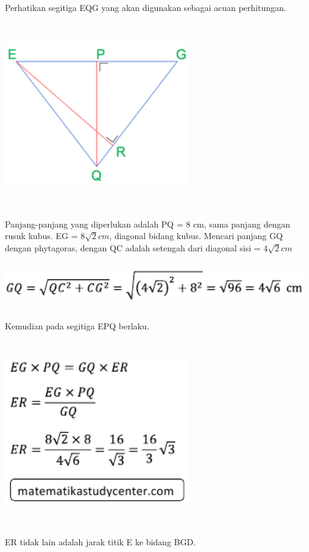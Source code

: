 \documentclass[11pt,fleqn]{book} %
\begin{document}
	Perhatikan segitiga EQG yang akan digunakan sebagai acuan perhitungan.

\includegraphics[width = 8cm, height= 8cm]{Pictures/dede11.png}
	
	Panjang-panjang yang diperlukan adalah PQ = 8 cm, sama panjang dengan rusuk kubus. EG = $8\sqrt{2} cm$, diagonal bidang kubus. Mencari panjang GQ dengan phytagoras, dengan QC adalah setengah dari diagonal sisi = $4\sqrt{2} cm$ 

\includegraphics[width = 13cm, height= 2cm]{Pictures/dede12.png}
	
	Kemudian pada segitiga EPQ berlaku.
	
\includegraphics[width = 8cm, height= 8cm]{Pictures/dede13.png}

	ER tidak lain adalah jarak titik E ke bidang BGD.
\end{document}
